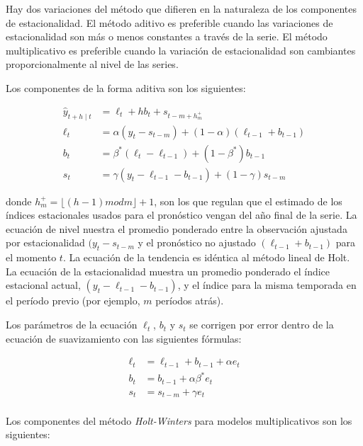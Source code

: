 Hay dos variaciones del método que difieren en la naturaleza de los componentes de estacionalidad. El método aditivo es preferible cuando las variaciones de estacionalidad son más o menos constantes a través de la serie. El método multiplicativo es preferible cuando la variación de estacionalidad son cambiantes proporcionalmente al nivel de las series.

Los componentes de la forma aditiva son los siguientes:

\begin{equation}
\begin{split}
	\hat{y}_{t+h \mid t} & = \ell_{t} + hb_{t} + s_{t-m+h_{m}^{+}} \\
 	\ell_{t} & = \alpha(y_{t} - s_{t-m}) + (1 - \alpha)(\ell_{t-1} + b_{t-1}) \\
    b_{t} & = \beta^{*}(\ell_{t} - \ell_{t-1}) + (1 - \beta^{*})b_{t-1} \\
    s_{t} & = \gamma(y_{t} - \ell_{t-1} - b_{t-1}) + (1-\gamma)s_{t-m}
\end{split}
\end{equation}

donde $h_{m}^{+} = \lfloor (h-1) mod m \rfloor + 1$, son los que regulan que el estimado de los índices estacionales usados para el pronóstico vengan del año final de la serie. La ecuación de nivel nuestra el promedio ponderado entre la observación ajustada por estacionalidad $(y_{t} - s_{t-m}$ y el pronóstico no ajustado $(\ell_{t-1} + b_{t-1})$ para el momento $t$. La ecuación de la tendencia es idéntica al método lineal de Holt. La ecuación de la estacionalidad muestra un promedio ponderado el índice estacional actual, $(y_{t} - \ell_{t-1} - b_{t-1})$, y el índice para la misma temporada en el período previo (por ejemplo, $m$ períodos atrás).

Los parámetros de la ecuación $\ell_{t}$, $b_{t}$ y $s_{t}$ se corrigen por error dentro de la ecuación de suavizamiento con las siguientes fórmulas:

\begin{equation}
\begin{split}
	\ell_{t} & = \ell_{t-1} + b_{t-1} + \alpha e_{t} \\
    b_{t} & = b_{t-1} + \alpha \beta^{*} e_{t} \\
    s_{t} & = s_{t-m} + \gamma e_{t} \\
\end{split}
\end{equation}

Los componentes del método \emph{Holt-Winters} para modelos multiplicativos son los siguientes:

